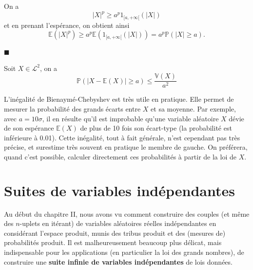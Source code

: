 \begin{preuve}
On a \[|X|^p \geq a^p 1_{[a, +\infty[}(|X|)\] et en prenant l'espérance,
on obtient ainsi
\[\mathbb{E}(|X|^p) \geq a^p \mathbb{E}(1_{[a, +\infty[}(|X|)) = a^p \mathbb{P}(|X|\geq a).\]

\hfill$\blacksquare$
\end{preuve}

\begin{corollaire}\label{IV-inegbc}

Soit \(X \in \mathcal{L}^2\), on a
\[\mathbb{P}(|X-\mathbb{E}(X)| \geq a) \leq \frac{\mathbb{V}(X)}{a^2}\]
\end{corollaire}

\label{IV-bienaymuxe9cheby}

\begin{remarque}[{Interprétation}]\label{IV-interpruxe9tation}

L'inégalité de Bienaymé-Chebyshev est très utile en pratique. Elle
permet de mesurer la probabilité des grands écarts entre \(X\) et sa
moyenne. Par exemple, avec \(a = 10 \sigma\), il en résulte qu'il est
improbable qu'une variable aléatoire \(X\) dévie de son espérance
\(\mathbb{E}(X)\) de plus de 10 fois son écart-type (la probabilité est
inférieure à 0.01). Cette inégalité, tout à fait générale, n'est
cependant pas très précise, et surestime très souvent en pratique le
membre de gauche. On préférera, quand c'est possible, calculer
directement ces probabilités à partir de la loi de \(X\).
\end{remarque}

\chapter{Suites de variables
indépendantes}\label{IV-suites-de-variables-induxe9pendantes}

Au début du chapitre II, nous avons vu comment construire des couples
(et même des \(n\)-uplets en itérant) de variables aléatoires réelles
indépendantes en considérant l'espace produit, munis des tribus produit
et des (mesures de) probabilités produit. Il est malheureusement
beaucoup plus délicat, mais indispensable pour les applications (en
particulier la loi des grands nombres), de construire une \textbf{suite
infinie de variables indépendantes} de lois données.

